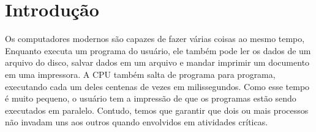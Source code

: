 \chapter{Introdução}

Os computadores modernos são capazes de fazer várias coisas ao mesmo tempo, Enquanto executa um
programa do usuário, ele também pode ler os dados de um arquivo do disco, salvar dados em um arquivo
e mandar imprimir um documento em uma impressora. A CPU também salta de programa para programa, executando
cada um deles centenas de vezes em milissegundos. Como esse tempo é muito pequeno, o usuário tem a impressão 
de que os programas estão sendo executados em paralelo. Contudo, temos que garantir que dois ou mais processos não
invadam uns aos outros quando envolvidos em atividades críticas.

\cite{muchnick}
